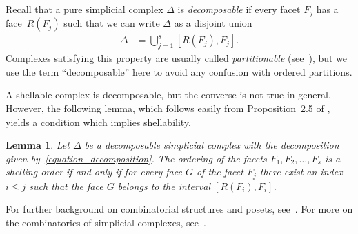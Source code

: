 \documentclass[10pt]{amsart}
\newtheorem{lemma}[theorem]{Lemma}
\theoremstyle{definition}
\newcommand{\cupdots}{\cup \cdots \cup}
\newcommand{\vanish}[1]{}
\begin{document}
Recall that a pure simplicial complex $\Delta$ 
is \emph{decomposable} if 
every facet $F_{j}$ has a face~$R(F_{j})$ such that
we can write $\Delta$ as
a disjoint union
\begin{align}
\Delta & = \bigcup_{j=1}^{s} [R(F_{j}), F_{j}] .
\label{equation_decomposition}
\end{align}
Complexes satisfying this property are usually called
\emph{partitionable} (see~\cite{Stanley_green}), but we use the term ``decomposable''
here to avoid any confusion with ordered partitions.

A shellable complex is decomposable,
but the converse is not true in general.
However, the following lemma, which follows
easily from Proposition~2.5 of
\cite{Bjorner_Wachs},
yields a condition
which implies shellability.



\begin{lemma}
Let $\Delta$ be a decomposable simplicial complex
with the decomposition
given by~\eqref{equation_decomposition}.
The ordering of the facets
$F_{1}, F_{2}, \ldots, F_{s}$ is a shelling order
if and only if for every face $G$ of the facet $F_{j}$
there exist an index $i \leq j$
such that the face $G$ belongs to
the interval $[R(F_{i}), F_{i}]$.
\label{lemma_shelling_condition}
\end{lemma}

\vanish{
\begin{proof}
We proceed by induction on $j$.
When $j=1$ the condition implies that
$R(F_{1})$ is the empty face, and hence
$\overline{F_{1}}$ is a shellable complex.
Assume now that
$\overline{F_{1}} \cupdots \overline{F_{j-1}}$
is a shellable complex,
that is,
$\overline{F_{1}} \cupdots \overline{F_{j-1}}
=
\bigcup_{i=1}^{j-1} [R(F_{i}), F_{i}]$.
Then any face of $F_{j}$ is either already a face
of $\overline{F_{1}} \cupdots \overline{F_{j-1}}$ 
or a face of $\overline{F_{j}} - \overline{F_{1}} \cupdots \overline{F_{j-1}}$ 
Hence the intersection
$(\overline{F_{1}} \cupdots \overline{F_{j-1}}) \cap \overline{F_{j}}$
is the complement of the interval $[R(F_{j}), F_{j}]$ in~$\overline{F_{j}}$,
proving that
$F_{1}, F_{2}, \ldots, F_{j}$ is a shelling order
and completing the induction.
\end{proof}
}

For further background on combinatorial structures and posets,
see~\cite{Stanley_EC_1}.
For more on the combinatorics of simplicial complexes,
see~\cite{Stanley_green}.
\end{document}
